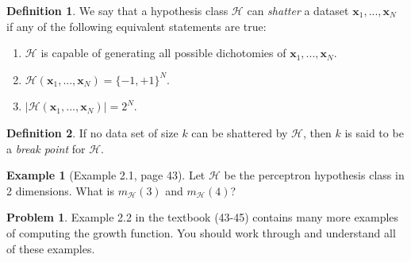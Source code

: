 \documentclass[10pt]{exam}
\theoremstyle{definition}
\newtheorem{problem}{Problem}
\newtheorem{example}{Example}
\newtheorem{defn}{Definition}
\newtheorem{fact}{Fact}
\newcommand{\R}{\mathbb R}
\newcommand{\x}{\mathbf x}
\newcommand{\mH}{m_{\mathcal H}}
\begin{document}
\begin{defn}
    We say that a hypothesis class $\mathcal H$ can \emph{shatter} a dataset $\x_1, ..., \x_N$ if any of the following equivalent statements are true:
    \begin{enumerate}
        \item $\mathcal H$ is capable of generating all possible dichotomies of $\x_1, ..., \x_N$.
        \item $\mathcal H(\x_1, ..., \x_N) = \{-1, +1\}^N$.
        \item $\left|\mathcal H(\x_1, ..., \x_N)\right| = 2^N$.
    \end{enumerate}
\end{defn}
\begin{defn}
    If no data set of size $k$ can be shattered by $\mathcal H$, then $k$ is said to be a \emph{break point} for $\mathcal H$.
\end{defn}

\begin{example}
    [Example 2.1, page 43]
    Let $\mathcal H$ be the perceptron hypothesis class in 2 dimensions.
    What is $\mH(3)$ and $\mH(4)$?
\end{example}

\vspace{6in}
\begin{problem}
    Example 2.2 in the textbook (43-45) contains many more examples of computing the growth function.
    You should work through and understand all of these examples.
\end{problem}
\newpage


\end{document}
